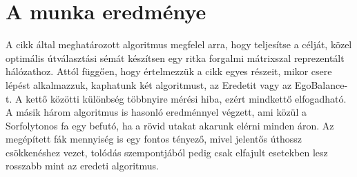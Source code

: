 \documentclass[12pt]{report}
\begin{document}
\section{A munka eredménye}

A \cite{avin_demand-aware_nodate} cikk által meghatározott algoritmus megfelel arra, hogy teljesítse a célját, közel optimális útválasztási sémát készítsen egy ritka forgalmi mátrixszal reprezentált hálózathoz.
Attól függően, hogy értelmezzük a cikk egyes részeit, mikor csere lépést alkalmazzuk, kaphatunk két algoritmust, az Eredetit vagy az EgoBalance-t.
A kettő közötti különbség többnyire mérési hiba, ezért mindkettő elfogadható.
A másik három algoritmus is hasonló eredménnyel végzett, ami közül a Sorfolytonos fa egy befutó, ha a rövid utakat akarunk elérni minden áron.
Az megépített fák mennyiség is egy fontos tényező, mivel jelentős úthossz csökkenéshez vezet, tolódás szempontjából pedig csak elfajult esetekben lesz rosszabb mint az eredeti algoritmus.




	
\end{document}
